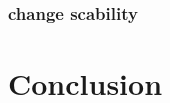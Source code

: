 \documentclass[senior,final,11pt]{iscs-thesis}
\begin{document}
\subsection{change scability}

\chapter{Conclusion}



 
 
\end{document}
